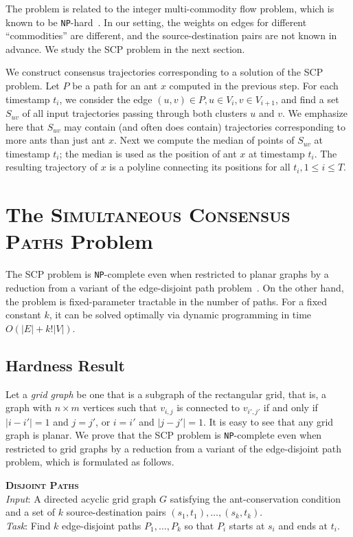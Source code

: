 \documentclass{llncs}
\newcommand{\blink}[1]{\textnormal{\texttt{#1}}}
\newcommand{\NPC}[0]{\blink{NP}-complete}
\newcommand{\NPH}[0]{\blink{NP}-hard}
\newcommand{\SCoP}{\textsc{SCP}}
\newcommand{\EDP}{\textsc{Disjoint Paths}}
\begin{document}
The problem is related to the integer multi-commodity flow problem,
which is known to be \NPH{}~\cite{Even75}. In our setting, the weights
on edges for different ``commodities'' are different, and the
source-destination pairs are not known in advance.
We study the \SCoP{} problem in the next section.

We construct consensus trajectories corresponding to a solution of
the \SCoP{} problem. Let $P$ be a path for an ant $x$ computed
in the previous step. For each timestamp $t_i$, we consider the edge
$(u,v)\in P, u\in V_i, v\in V_{i+1}$, and find a set $S_{uv}$ of all
input trajectories passing through both clusters $u$ and $v$. We
emphasize here that $S_{uv}$ may contain (and often does contain)
trajectories corresponding to more ants than just ant $x$. Next we
compute the median of points of $S_{uv}$ at timestamp $t_i$; the
median is used as the position of ant $x$ at timestamp $t_i$. The
resulting trajectory of $x$ is a polyline connecting its positions for
all $t_i, 1\le i \le T$.

\section{The \textsc{Simultaneous Consensus Paths} Problem}
\label{sect:antprob}

The \SCoP{} problem is \NPC{} even when restricted to planar graphs by a reduction from a
variant of the edge-disjoint path problem~\cite{Marx04}.
On the other hand, the problem is fixed-parameter tractable in the number of paths.
For a fixed constant $k$, it can be solved optimally via dynamic programming
in time $O(|E| + k!|V|)$.

\subsection{Hardness Result}


Let a \emph{grid graph} be one that is a subgraph of the
rectangular grid, that is, a graph with $n\times m$ vertices such that
$v_{i,j}$ is connected to $v_{i',j'}$ if and only if $|i-i'|=1$ and
$j=j'$, or $i=i'$ and $|j-j'|=1$. It is easy to see that any grid
graph is planar. We prove that the \SCoP{} problem is \NPC{} even when
restricted to grid graphs by
a reduction from a variant of the edge-disjoint path problem, which is
formulated as follows.

\medskip

\noindent\textbf{\EDP{}}\\
\indent\emph{Input}: A directed acyclic grid graph $G$ satisfying the
ant-conservation condition and a set of $k$ source-destination pairs
$(s_1,t_1),\dots,(s_k,t_k)$. \\ \indent\emph{Task}: Find $k$
edge-disjoint paths $P_1,\dots,P_k$ so that $P_i$ starts at $s_i$ and
ends at $t_i$.
\end{document}
